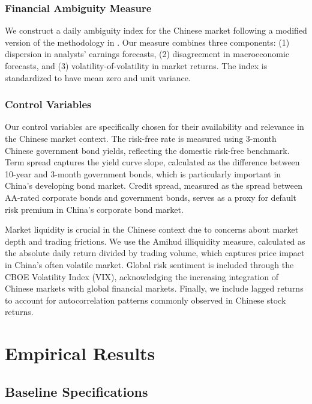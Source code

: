 \documentclass[12pt]{article}
\begin{document}
\subsubsection{Financial Ambiguity Measure}

We construct a daily ambiguity index for the Chinese market following a modified version of the methodology in \citet{brenner2018ambiguity}. Our measure combines three components: (1) dispersion in analysts' earnings forecasts, (2) disagreement in macroeconomic forecasts, and (3) volatility-of-volatility in market returns. The index is standardized to have mean zero and unit variance.

\subsubsection{Control Variables}

Our control variables are specifically chosen for their availability and relevance in the Chinese market context. The risk-free rate is measured using 3-month Chinese government bond yields, reflecting the domestic risk-free benchmark. Term spread captures the yield curve slope, calculated as the difference between 10-year and 3-month government bonds, which is particularly important in China's developing bond market. Credit spread, measured as the spread between AA-rated corporate bonds and government bonds, serves as a proxy for default risk premium in China's corporate bond market.

Market liquidity is crucial in the Chinese context due to concerns about market depth and trading frictions. We use the Amihud illiquidity measure, calculated as the absolute daily return divided by trading volume, which captures price impact in China's often volatile market. Global risk sentiment is included through the CBOE Volatility Index (VIX), acknowledging the increasing integration of Chinese markets with global financial markets. Finally, we include lagged returns to account for autocorrelation patterns commonly observed in Chinese stock returns.

\section{Empirical Results}

\subsection{Baseline Specifications}
\end{document}

